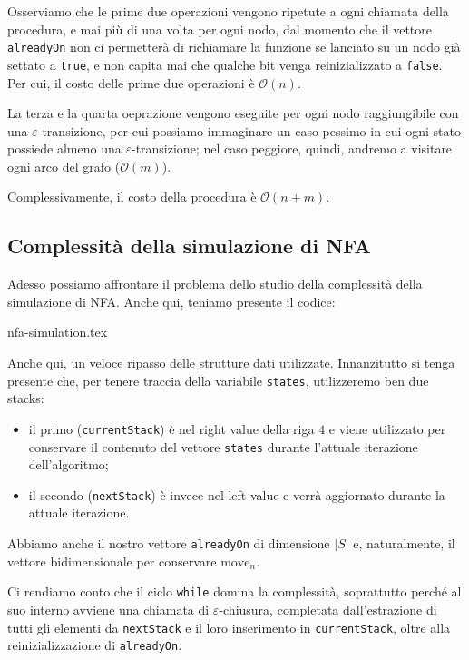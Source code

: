 \documentclass[class=book, crop=false, oneside, 12pt]{standalone}
\begin{document}
Osserviamo che le prime due operazioni vengono ripetute a ogni chiamata della procedura, e mai più di una volta per ogni nodo, dal momento che il vettore \texttt{alreadyOn} non ci permetterà di richiamare la funzione se lanciato su un nodo già settato a \texttt{true}, e non capita mai che qualche bit venga reinizializzato a \texttt{false}. Per cui, il costo delle prime due operazioni è \(\mathcal{O}(n)\).

La terza e la quarta oeprazione vengono eseguite per ogni nodo raggiungibile con una \(\varepsilon\)-transizione, per cui possiamo immaginare un caso pessimo in cui ogni stato possiede almeno una \(\varepsilon\)-transizione; nel caso peggiore, quindi, andremo a visitare ogni arco del grafo (\(\mathcal{O}(m)\)).

Complessivamente, il costo della procedura è \(\mathcal{O}(n + m)\).

\subsection{Complessità della simulazione di NFA}
Adesso possiamo affrontare il problema dello studio della complessità della simulazione di NFA. Anche qui, teniamo presente il codice:

{nfa-simulation.tex}

\noindent Anche qui, un veloce ripasso delle strutture dati utilizzate. Innanzitutto si tenga presente che, per tenere traccia della variabile \texttt{states}, utilizzeremo ben due stacks:

\begin{itemize}
    \item il primo (\texttt{currentStack}) è nel right value della riga \(4\) e viene utilizzato per conservare il contenuto del vettore \texttt{states} durante l'attuale iterazione dell'algoritmo;
    \item il secondo (\texttt{nextStack}) è invece  nel left value e verrà aggiornato durante la attuale iterazione.
\end{itemize}

\noindent Abbiamo anche il nostro vettore \texttt{alreadyOn} di dimensione \(|S|\) e, naturalmente, il vettore bidimensionale per conservare \(\textrm{move}_n\).

Ci rendiamo conto che il ciclo \texttt{while} domina la complessità, soprattutto perché al suo interno avviene una chiamata di \(\varepsilon\)-chiusura, completata dall'estrazione di tutti gli elementi da \texttt{nextStack} e il loro inserimento in \texttt{currentStack}, oltre alla reinizializzazione di \texttt{alreadyOn}.
\end{document}
